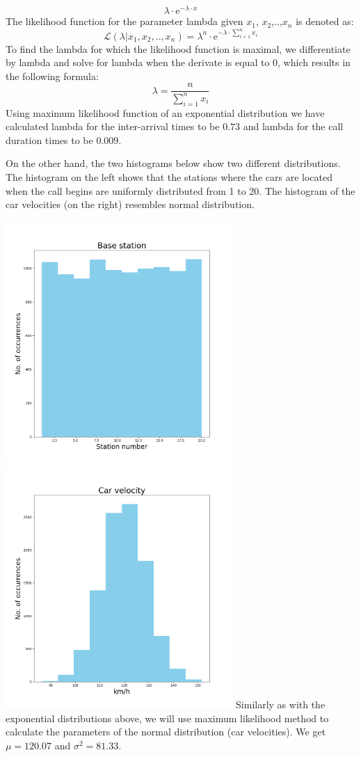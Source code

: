 \documentclass[12pt,a4paper]{article}
\begin{document}
\begin{equation} \lambda\cdot\mathrm{e}^{-\lambda\cdot x} \end{equation}
The likelihood function for the parameter lambda given $x_1$, $x_2$,..,$x_n$ is denoted as:
\begin{equation} \mathcal{L}(\lambda|x_1, x_2,..,x_n) = \lambda^{n}\cdot\mathrm{e}^{-\lambda\cdot \sum_{i=1}^{n} x_i} \end{equation}
To find the lambda for which the likelihood function is maximal, we differentiate by lambda and solve for lambda when the derivate is equal to 0, which results in the following formula:
\begin{equation} \lambda=\dfrac{n}{\sum_{i=1}^{n} x_i} \end{equation}
Using maximum likelihood function of an exponential distribution we have calculated lambda for the inter-arrival times to be $0.73$ and lambda for the call duration times to be $0.009$.

\pagebreak
On the other hand, the two histograms below show two different distributions. The histogram on the left shows that the stations where the cars are located when the call begins are uniformly distributed from 1 to 20. The histogram of the car velocities (on the right) resembles normal distribution.\par
\noindent \includegraphics[width=3.4in]{Figure_2}
\includegraphics[width=3.4in]{Figure_4}
Similarly as with the exponential distributions above, we will use maximum likelihood method to calculate the parameters of the normal distribution (car velocities). We get $\mu=120.07$ and $\sigma^2=81.33$.
\end{document}
